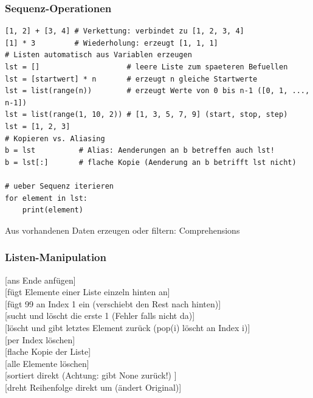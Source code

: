 \subsubsection{Sequenz-Operationen}\label{sec:01-allgemeine-sequenz-operationen}
\begin{codebox}
\begin{lstlisting}[style=CodeExpert]
[1, 2] + [3, 4] # Verkettung: verbindet zu [1, 2, 3, 4]
[1] * 3         # Wiederholung: erzeugt [1, 1, 1]
# Listen automatisch aus Variablen erzeugen
lst = []                    # leere Liste zum spaeteren Befuellen
lst = [startwert] * n       # erzeugt n gleiche Startwerte
lst = list(range(n))        # erzeugt Werte von 0 bis n-1 ([0, 1, ..., n-1])
lst = list(range(1, 10, 2)) # [1, 3, 5, 7, 9] (start, stop, step)
lst = [1, 2, 3]
# Kopieren vs. Aliasing
b = lst          # Alias: Aenderungen an b betreffen auch lst!
b = lst[:]       # flache Kopie (Aenderung an b betrifft lst nicht)

# ueber Sequenz iterieren
for element in lst:
    print(element)
\end{lstlisting}
Aus vorhandenen Daten erzeugen oder filtern: Comprehensions 
\end{codebox}

\subsubsection{Listen-Manipulation}\label{sec:01-häufige-listen-operationen}
\begin{contentbox}
[ans Ende anfügen]\\
[fügt Elemente einer Liste einzeln hinten an]\\
[fügt 99 an Index 1 ein (verschiebt den Rest nach hinten)]\\
[sucht und löscht die erste 1 (Fehler falls nicht da)]\\
[löscht und gibt letztes Element zurück (pop(i) löscht an Index i)]\\
[per Index löschen]\\
[flache Kopie der Liste]\\
[alle Elemente löschen]\\
[sortiert direkt (Achtung: gibt None zurück!) ]\\
[dreht Reihenfolge direkt um (ändert Original)]
\end{contentbox}

